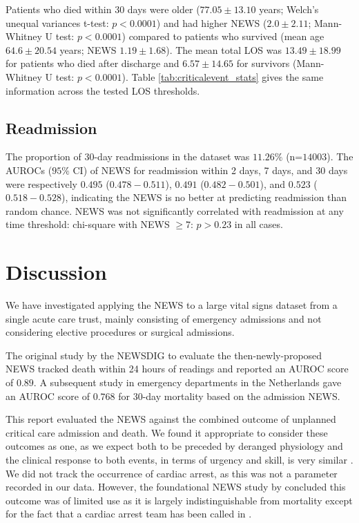 \documentclass[10pt,journal, compsoc]{IEEEtran}
\begin{document}
Patients who died within 30 days were older ($77.05 \pm 13.10$ years; Welch's unequal variances t-test: $p < 0.0001$) and had higher NEWS ($2.0 \pm 2.11$; Mann-Whitney U test: $p < 0.0001$) compared to patients who survived (mean age $64.6 \pm 20.54$ years; NEWS $1.19 \pm 1.68$). The mean total LOS was $13.49 \pm 18.99$ for patients who died after discharge and $6.57 \pm 14.65$ for survivors (Mann-Whitney U test: $p < 0.0001$). Table \ref{tab:criticalevent_stats} gives the same information across the tested LOS thresholds.

\subsection{Readmission} The proportion of 30-day readmissions in the dataset was $11.26\%$ (n=$14003$). The AUROCs ($95\%$ CI) of NEWS for readmission within 2 days, 7 days, and 30 days were respectively $0.495$ ($0.478-0.511$), $0.491$ ($0.482-0.501$), and $0.523$ ($0.518-0.528$), indicating the NEWS is no better at predicting readmission than random chance. NEWS was not significantly correlated with readmission at any time threshold: chi-square with NEWS $\geq 7$: $p > 0.23$ in all cases.

\section{Discussion}
We have investigated applying the NEWS to a large vital signs dataset from a single acute care trust, mainly consisting of emergency admissions and not considering elective procedures or surgical admissions.

The original study by the NEWSDIG to evaluate the then-newly-proposed NEWS tracked death within 24 hours of readings and reported an AUROC score of $0.89$. A subsequent study in emergency departments in the Netherlands gave an AUROC score of $0.768$ for 30-day mortality based on the admission NEWS.

This report evaluated the NEWS against the combined outcome of unplanned critical care admission and death. We found it appropriate to consider these outcomes as one, as we expect both to be preceded by deranged physiology and the clinical response to both events, in terms of urgency and skill, is very similar \cite[pp.~4]{Smith13}. We did not track the occurrence of cardiac arrest, as this was not a parameter recorded in our data. However, the foundational NEWS study by \cite{Smith13} concluded this outcome was of limited use as it is largely indistinguishable from mortality except for the fact that a cardiac arrest team has been called in \cite[pp.~4]{Smith13}.
\end{document}
